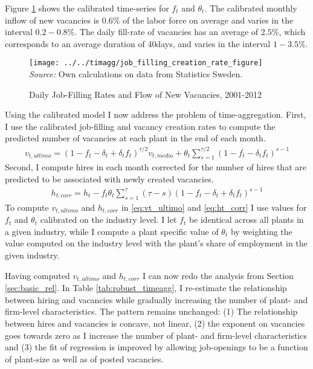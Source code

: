 Figure \ref{fig:filling_rates} shows the calibrated time-series for $f_t$ and $\theta_t$. The calibrated monthly inflow of new vacancies is $0.6 \%$ of the labor force on average and varies in the interval $0.2-0.8 \%$. The daily fill-rate of vacancies has an average of $2.5 \%$, which corresponds to an average duration of 40days, and varies in the interval $1-3.5\%$. 

\begin{figure}[t]
\centering
\caption{Daily Job-Filling Rates and Flow of New Vacancies, 2001-2012}
\texttt{[image: ../../timagg/job\_filling\_creation\_rate\_figure]}
\flushleft
\footnotesize{\emph{Source:} Own calculations on data from Statistics Sweden.}
\label{fig:filling_rates}
\end{figure}

Using the calibrated model I now address the problem of time-aggregation. First, I use the calibrated job-filling  and vacancy creation rates to compute the predicted number of vacancies at each plant in the end of each month. 
\begin{align}
v_{t,ultimo}=\left( 1-f_t-\delta_t+\delta_t f_t \right)^{\tau/2} v_{t,medio} + \theta_t \sum_{s=1}^{\tau/2} \left( 1-f_t-\delta_t f_t \right)^{s-1} \label{eq:vt_ultimo}
\end{align}
Second, I compute hires in each month corrected for the number of hires that are predicted to be associated with newly created vacancies. 
\begin{align}
h_{t,corr}=h_t-f_t \theta_t \sum_{s=1}^{\tau} \left( \tau- s\right) \left( 1-f_t-\delta_t+\delta_t f_t \right)^{s-1} \label{eq:ht_corr}
\end{align}
To compute $v_{t,ultimo}$ and $h_{t,corr}$ in \eqref{eq:vt_ultimo} and \eqref{eq:ht_corr} I use values for $f_t$ and $\theta_t$ calibrated on the industry level. I let $f_t$ be identical across all plants in a given industry, while I compute a plant specific value of $\theta_t$ by weighting the value computed on the industry level with the plant's share of employment in the given industry. 

Having computed $v_{t,ultimo}$ and $h_{t,corr}$ I can now redo the analysis from Section \ref{sec:basic_rel}. In Table \ref{tab:robust_timeagg}, I re-estimate the relationship between hiring and vacancies while gradually increasing the number of plant- and firm-level characteristics. The pattern remains unchanged: (1) The relationship between hires and vacancies is concave, not linear, (2) the exponent on vacancies goes towards zero as I increase the number of plant- and firm-level characteristics and (3) the fit of regression is improved by allowing job-openings to be a function of plant-size as well as of posted vacancies. 

